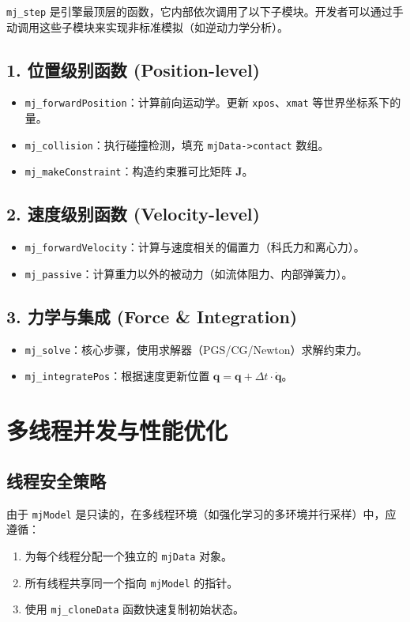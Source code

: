 \documentclass[11pt,a4paper]{book}
\begin{document}
\texttt{mj\_step} 是引擎最顶层的函数，它内部依次调用了以下子模块。开发者可以通过手动调用这些子模块来实现非标准模拟（如逆动力学分析）。

\subsection{1. 位置级别函数 (Position-level)}
\begin{itemize}
    \item \texttt{mj\_forwardPosition}：计算前向运动学。更新 \texttt{xpos}、\texttt{xmat} 等世界坐标系下的量。
    \item \texttt{mj\_collision}：执行碰撞检测，填充 \texttt{mjData->contact} 数组。
    \item \texttt{mj\_makeConstraint}：构造约束雅可比矩阵 $\bm{J}$。
\end{itemize}

\subsection{2. 速度级别函数 (Velocity-level)}
\begin{itemize}
    \item \texttt{mj\_forwardVelocity}：计算与速度相关的偏置力（科氏力和离心力）。
    \item \texttt{mj\_passive}：计算重力以外的被动力（如流体阻力、内部弹簧力）。
\end{itemize}

\subsection{3. 力学与集成 (Force \& Integration)}
\begin{itemize}
    \item \texttt{mj\_solve}：核心步骤，使用求解器（PGS/CG/Newton）求解约束力。
    \item \texttt{mj\_integratePos}：根据速度更新位置 $\bm{q} = \bm{q} + \Delta t \cdot \dot{\bm{q}}$。
\end{itemize}

\section{多线程并发与性能优化}

\subsection{线程安全策略}
由于 \texttt{mjModel} 是只读的，在多线程环境（如强化学习的多环境并行采样）中，应遵循：
\begin{enumerate}
    \item 为每个线程分配一个独立的 \texttt{mjData} 对象。
    \item 所有线程共享同一个指向 \texttt{mjModel} 的指针。
    \item 使用 \texttt{mj\_cloneData} 函数快速复制初始状态。
\end{enumerate}
\end{document}
